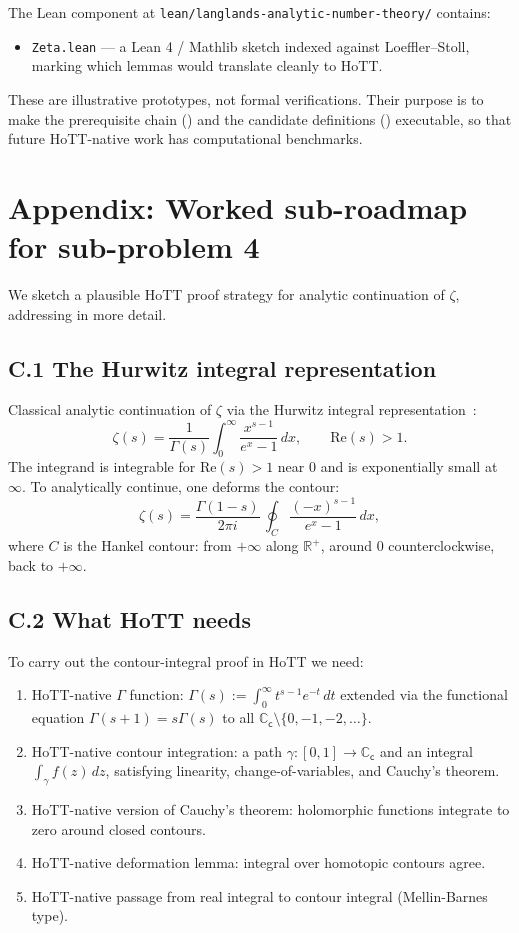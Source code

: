 \documentclass[12pt]{article}
\theoremstyle{definition}
\theoremstyle{remark}
\newcommand{\C}{\mathbb{C}}
\newcommand{\R}{\mathbb{R}}
\newcommand{\Cc}{\C_{\mathsf{c}}}
\begin{document}
The Lean component at \texttt{lean/langlands-analytic-number-theory/}
contains:

\begin{itemize}
\item \texttt{Zeta.lean} --- a Lean 4 / Mathlib sketch indexed against
Loeffler--Stoll, marking which lemmas would translate cleanly to HoTT.
\end{itemize}

These are illustrative prototypes, not formal verifications. Their purpose
is to make the prerequisite chain () and the candidate
definitions () executable, so that future HoTT-native work
has computational benchmarks.

\section{Appendix: Worked sub-roadmap for sub-problem 4}\label{app:cont}

We sketch a plausible HoTT proof strategy for analytic continuation of
$\zeta$, addressing  in more detail.

\subsection*{C.1 The Hurwitz integral representation}

Classical analytic continuation of $\zeta$ via the Hurwitz integral
representation~\cite{Hurwitz1882}:
\[
\zeta(s) = \frac{1}{\Gamma(s)} \int_0^\infty \frac{x^{s-1}}{e^x - 1}\, dx,
\qquad \mathrm{Re}(s) > 1.
\]
The integrand is integrable for $\mathrm{Re}(s) > 1$ near $0$ and is
exponentially small at $\infty$. To analytically continue, one deforms the
contour:
\[
\zeta(s) = \frac{\Gamma(1-s)}{2\pi i}\,\oint_C \frac{(-x)^{s-1}}{e^x - 1}\,dx,
\]
where $C$ is the Hankel contour: from $+\infty$ along $\R^+$, around $0$
counterclockwise, back to $+\infty$.

\subsection*{C.2 What HoTT needs}

To carry out the contour-integral proof in HoTT we need:
\begin{enumerate}
\item HoTT-native $\Gamma$ function: $\Gamma(s) := \int_0^\infty t^{s-1}
e^{-t}\, dt$ extended via the functional equation $\Gamma(s+1) = s\Gamma(s)$
to all $\Cc \setminus \{0,-1,-2,\ldots\}$.
\item HoTT-native contour integration: a path $\gamma:[0,1] \to \Cc$ and an
integral $\int_\gamma f(z)\, dz$, satisfying linearity, change-of-variables,
and Cauchy's theorem.
\item HoTT-native version of Cauchy's theorem: holomorphic functions integrate
to zero around closed contours.
\item HoTT-native deformation lemma: integral over homotopic contours agree.
\item HoTT-native passage from real integral to contour integral
(Mellin-Barnes type).
\end{enumerate}
\end{document}
